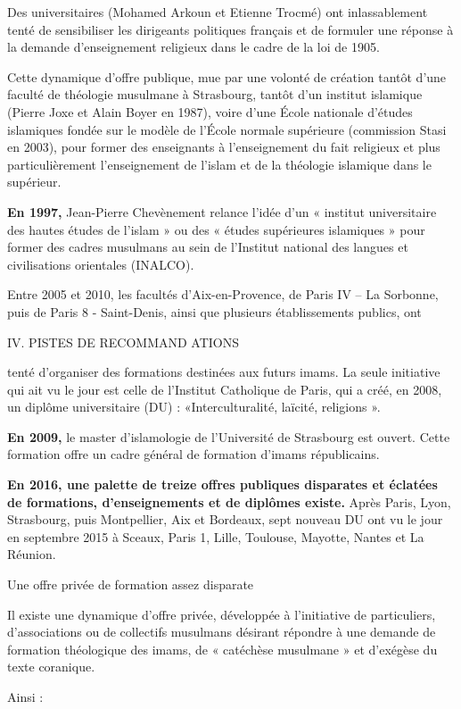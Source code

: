 Des universitaires (Mohamed Arkoun et Etienne Trocmé) ont inlassablement
tenté de sensibiliser les dirigeants politiques français et de formuler
une réponse à la demande d'enseignement religieux dans le cadre de la
loi de 1905.

Cette dynamique d'offre publique, mue par une volonté de création tantôt
d'une faculté de théologie musulmane à Strasbourg, tantôt d'un institut
islamique (Pierre Joxe et Alain Boyer en 1987), voire d'une École
nationale d'études islamiques fondée sur le modèle de l'École normale
supérieure (commission Stasi en 2003), pour former des enseignants à
l'enseignement du fait religieux et plus particulièrement l'enseignement
de l'islam et de la théologie islamique dans le supérieur.

\textbf{En 1997,} Jean-Pierre Chevènement relance l'idée d'un « institut
universitaire des hautes études de l'islam » ou des « études supérieures
islamiques » pour former des cadres musulmans au sein de l'Institut
national des langues et civilisations orientales (INALCO).

Entre 2005 et 2010, les facultés d'Aix-en-Provence, de Paris IV -- La
Sorbonne, puis de Paris 8 - Saint-Denis, ainsi que plusieurs
établissements publics, ont

IV. PISTES DE RECOMMAND ATIONS

tenté d'organiser des formations destinées aux futurs imams. La seule
initiative qui ait vu le jour est celle de l'Institut Catholique de
Paris, qui a créé, en 2008, un diplôme universitaire (DU) :
«Interculturalité, laïcité, religions ».

\textbf{En 2009,} le master d'islamologie de l'Université de Strasbourg
est ouvert. Cette formation offre un cadre général de formation d'imams
républicains.

\textbf{En 2016, une palette de treize offres publiques disparates et
éclatées de formations, d'enseignements et de diplômes existe.} Après
Paris, Lyon, Strasbourg, puis Montpellier, Aix et Bordeaux, sept nouveau
DU ont vu le jour en septembre 2015 à Sceaux, Paris 1, Lille, Toulouse,
Mayotte, Nantes et La Réunion.


Une offre privée de formation assez disparate


Il existe une dynamique d'offre privée, développée à l'initiative de
particuliers, d'associations ou de collectifs musulmans désirant
répondre à une demande de formation théologique des imams, de «
catéchèse musulmane » et d'exégèse du texte coranique.

Ainsi :


